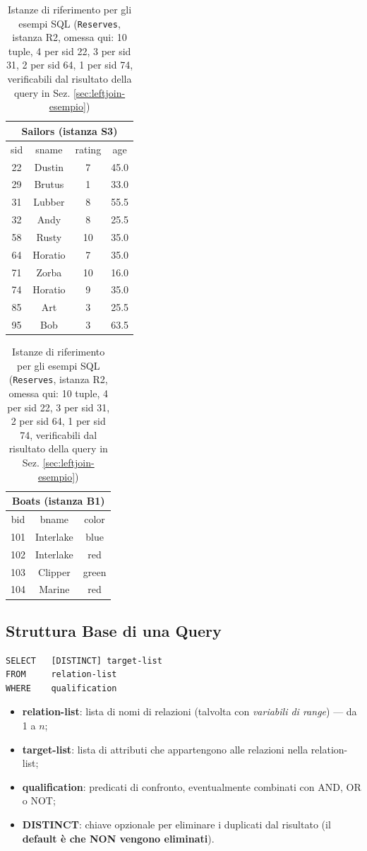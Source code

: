 \documentclass[12pt, a4paper]{article}
\begin{document}
\begin{table}[H]
\centering
\begin{tabular}{@{}cccc@{}}
\toprule
\multicolumn{4}{c}{\textbf{Sailors} (istanza S3)} \\
\midrule
sid & sname & rating & age \\
\midrule
22 & Dustin & 7 & 45.0 \\
29 & Brutus & 1 & 33.0 \\
31 & Lubber & 8 & 55.5 \\
32 & Andy & 8 & 25.5 \\
58 & Rusty & 10 & 35.0 \\
64 & Horatio & 7 & 35.0 \\
71 & Zorba & 10 & 16.0 \\
74 & Horatio & 9 & 35.0 \\
85 & Art & 3 & 25.5 \\
95 & Bob & 3 & 63.5 \\
\bottomrule
\end{tabular}
\qquad
\begin{tabular}{@{}ccc@{}}
\toprule
\multicolumn{3}{c}{\textbf{Boats} (istanza B1)} \\
\midrule
bid & bname & color \\
\midrule
101 & Interlake & blue \\
102 & Interlake & red \\
103 & Clipper & green \\
104 & Marine & red \\
\bottomrule
\end{tabular}
\caption{Istanze di riferimento per gli esempi SQL (\texttt{Reserves}, istanza R2, omessa qui: 10 tuple, 4 per sid 22, 3 per sid 31, 2 per sid 64, 1 per sid 74, verificabili dal risultato della query in Sez. \ref{sec:leftjoin-esempio})}
\end{table}

\subsection{Struttura Base di una Query}

\begin{verbatim}
SELECT   [DISTINCT] target-list
FROM     relation-list
WHERE    qualification
\end{verbatim}

\begin{itemize}
    \item \textbf{relation-list}: lista di nomi di relazioni (talvolta con \textit{variabili di range}) — da 1 a $n$;
    \item \textbf{target-list}: lista di attributi che appartengono alle relazioni nella relation-list;
    \item \textbf{qualification}: predicati di confronto, eventualmente combinati con AND, OR o NOT;
    \item \textbf{DISTINCT}: chiave opzionale per eliminare i duplicati dal risultato (il \textbf{default è che NON vengono eliminati}).
\end{itemize}
\end{document}
